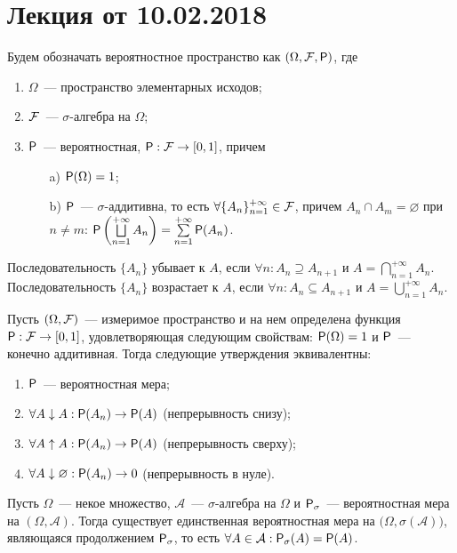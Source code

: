 \section{Лекция от 10.02.2018}
Будем обозначать вероятностное пространство как $(\Omega,  \F, \P)$, где 
\begin{enumerate}
	\item $\Omega$~--- пространство элементарных исходов;
	\item $\F$~--- $\sigma$-алгебра на $\Omega$;
	\item{ $\P$~--- вероятностная, $\P: \F \rightarrow [0, 1]$, причем
		\begin{enumerate}
			\item[a)] $\P (\Omega) = 1$;
			\item[b)] $\P$~--- $\sigma$-аддитивна, то есть $\forall \{A_n\}_{n = 1}^{+\infty} \in \F$, причем $A_n \cap A_m = \varnothing$ при $n \neq m$: $\P \left( \bigsqcup\limits_{n=1}^{+\infty} A_n \right) = \sum \limits_{n = 1}^{+\infty} \P (A_n)$.
		\end{enumerate}
	}
\end{enumerate}
\begin{definition}
	Последовательность $\{A_n\}$ убывает к $A$, если $\forall n: A_{n} \supseteq A_{n+1}$ и   $A = \bigcap\limits_{n = 1}^{+\infty} A_n$. Последовательность $\{A_n\}$ возрастает к $A$, если $\forall n: A_{n} \subseteq A_{n+1}$ и   $A = \bigcup\limits_{n = 1}^{+\infty} A_n$.
\end{definition}
\begin{theorem}
	Пусть $(\Omega, \F )$~--- измеримое пространство и на нем определена функция $\P : \F \rightarrow [0,1]$, удовлетворяющая следующим свойствам: $\P (\Omega) = 1$ и $\P$~--- конечно аддитивная. Тогда следующие утверждения эквивалентны:
	\begin{enumerate}
		\item $\P$~--- вероятностная мера;
		\item $\forall A \downarrow A: \P (A_n) \rightarrow \P(A)$ (непрерывность снизу);
		\item $\forall A \uparrow A: \P (A_n) \rightarrow \P(A)$ (непрерывность сверху);
		\item  $\forall A \downarrow \varnothing: \P (A_n) \rightarrow 0$ (непрерывность в нуле).
	\end{enumerate}
\end{theorem}
\begin{theorem}[Каратеодори][б/д]
	Пусть $\Omega$~--- некое множество, $\mathcal{A}$~--- $\sigma$-алгебра на $\Omega$ и $\P_\sigma$~--- вероятностная мера на $(\Omega, \mathcal{A})$. Тогда существует единственная вероятностная мера на $\big(\Omega, \sigma(\mathcal{A}) \big)$, являющаяся продолжением $\P_\sigma$, то есть  $ \forall A \in \mathcal{A}: \P_\sigma(A) = \P(A)$.
\end{theorem}

